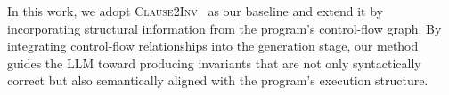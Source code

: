 In this work, we adopt \textsc{Clause2Inv}~\cite{cao2025clause2inv} as our baseline and extend it by incorporating structural information from the program’s control-flow graph.  
By integrating control-flow relationships into the generation stage, our method guides the LLM toward producing invariants that are not only syntactically correct but also semantically aligned with the program’s execution structure.
